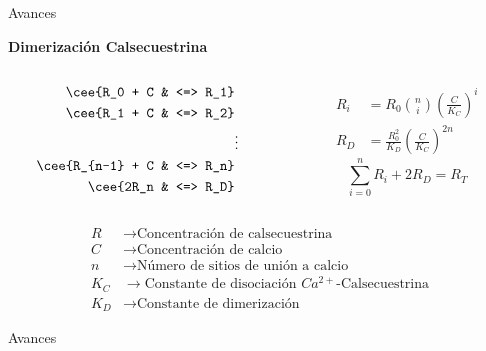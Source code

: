\begin{frame}{Avances}
	\begin{center}
	{\Large 	\textbf{Dimerización Calsecuestrina}}
	\end{center}
	\begin{columns}
		\begin{column}{0.5\textwidth}
			\begin{align*}
			\cee{R_0 + C & <=> R_1} \\
			\cee{R_1 + C & <=> R_2} \\
			& \vdots \\
			\cee{R_{n-1} + C & <=> R_n} \\
			\cee{2R_n & <=> R_D}
			\end{align*}
		\end{column}
		\begin{column}{0.5\textwidth}
			\begin{align*}
			R_i & = R_0 \binom{n}{i} \left(\frac{C}{K_C}\right)^i \\
			R_D & = \frac{R_0^2}{K_D} \left(\frac{C}{K_C}\right)^{2n}
			\end{align*}
			\begin{equation*}
			\sum_{i=0}^n R_i + 2 R_D = R_T
			\end{equation*}
		\end{column}
	\end{columns}
	\begin{align*}
	R & \rightarrow \text{Concentración de calsecuestrina} \\
	C & \rightarrow \text{Concentración de calcio} \\
	n & \rightarrow \text{Número de sitios de unión a calcio} \\
	K_C & \rightarrow \text{Constante de disociación $Ca^{2+}$-Calsecuestrina} \\
	K_D & \rightarrow \text{Constante de dimerización}
	\end{align*}
\end{frame}

\begin{frame}{Avances}
	
\end{frame}
